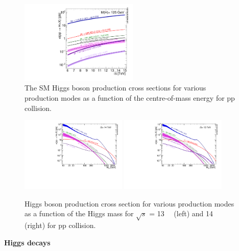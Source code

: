 \begin{figure}[!htb]
  \centering
  \includegraphics[width=0.5\textwidth]{figures/Theory/Plot_Escan_H125_new_sqrt.pdf}
  \caption{The SM Higgs boson production cross sections for various production modes as a function of the centre-of-mass energy for pp collision.}
  \label{fig:higgs_productions_xs}
\end{figure}
\begin{figure}[!htb]
  \centering
  \includegraphics[width=0.45\textwidth]{figures/Theory/plotAll_14tev_BSM_sqrt.pdf}
  \includegraphics[width=0.45\textwidth]{figures/Theory/plotAll_13tev_BSM_sqrt.pdf}
  \caption{Higgs boson production cross section for various production modes as a function of the Higgs mass for $\sqrt{s}$ = 13~\tev~ (left) and 14~\tev~ (right) for pp collision.}
  \label{fig:higgs_productions_xs2}
\end{figure}

\textbf{Higgs decays}

